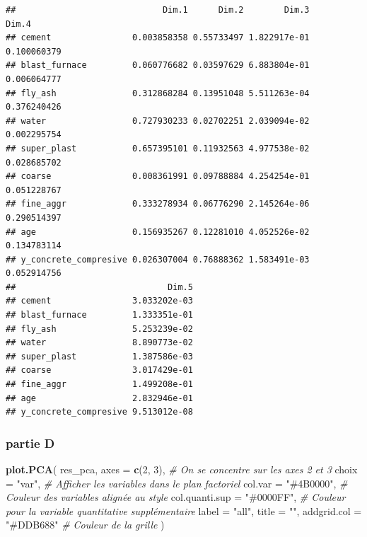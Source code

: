 \documentclass[
  12pt,
]{article}
\newenvironment{Shaded}{\begin{snugshade}}{\end{snugshade}}
\newcommand{\AttributeTok}[1]{\textcolor[rgb]{0.13,0.29,0.53}{#1}}
\newcommand{\CommentTok}[1]{\textcolor[rgb]{0.56,0.35,0.01}{\textit{#1}}}
\newcommand{\DecValTok}[1]{\textcolor[rgb]{0.00,0.00,0.81}{#1}}
\newcommand{\FunctionTok}[1]{\textcolor[rgb]{0.13,0.29,0.53}{\textbf{#1}}}
\newcommand{\NormalTok}[1]{#1}
\newcommand{\StringTok}[1]{\textcolor[rgb]{0.31,0.60,0.02}{#1}}
\begin{document}
\begin{verbatim}
##                             Dim.1      Dim.2        Dim.3       Dim.4
## cement                0.003858358 0.55733497 1.822917e-01 0.100060379
## blast_furnace         0.060776682 0.03597629 6.883804e-01 0.006064777
## fly_ash               0.312868284 0.13951048 5.511263e-04 0.376240426
## water                 0.727930233 0.02702251 2.039094e-02 0.002295754
## super_plast           0.657395101 0.11932563 4.977538e-02 0.028685702
## coarse                0.008361991 0.09788884 4.254254e-01 0.051228767
## fine_aggr             0.333278934 0.06776290 2.145264e-06 0.290514397
## age                   0.156935267 0.12281010 4.052526e-02 0.134783114
## y_concrete_compresive 0.026307004 0.76888362 1.583491e-03 0.052914756
##                              Dim.5
## cement                3.033202e-03
## blast_furnace         1.333351e-01
## fly_ash               5.253239e-02
## water                 8.890773e-02
## super_plast           1.387586e-03
## coarse                3.017429e-01
## fine_aggr             1.499208e-01
## age                   2.832946e-01
## y_concrete_compresive 9.513012e-08
\end{verbatim}

\subsubsection{partie D}\label{partie-d}

\begin{Shaded}
\begin{Highlighting}[]
\FunctionTok{plot.PCA}\NormalTok{(}
\NormalTok{    res\_pca,}
    \AttributeTok{axes =} \FunctionTok{c}\NormalTok{(}\DecValTok{2}\NormalTok{, }\DecValTok{3}\NormalTok{),             }\CommentTok{\# On se concentre sur les axes 2 et 3}
    \AttributeTok{choix =} \StringTok{"var"}\NormalTok{,              }\CommentTok{\# Afficher les variables dans le plan factoriel}
    \AttributeTok{col.var =} \StringTok{"\#4B0000"}\NormalTok{,        }\CommentTok{\# Couleur des variables alignée au style}
    \AttributeTok{col.quanti.sup =} \StringTok{"\#0000FF"}\NormalTok{, }\CommentTok{\# Couleur pour la variable quantitative supplémentaire}
    \AttributeTok{label =} \StringTok{"all"}\NormalTok{,}
    \AttributeTok{title =} \StringTok{""}\NormalTok{,}
    \AttributeTok{addgrid.col =} \StringTok{"\#DDB688"}     \CommentTok{\# Couleur de la grille}
\NormalTok{  )}
\end{Highlighting}
\end{Shaded}
\end{document}
